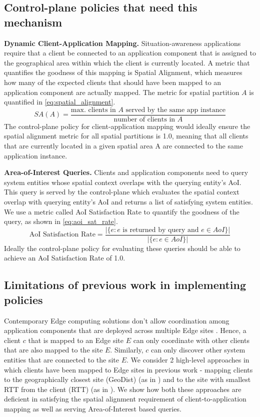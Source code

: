 \subsection{Control-plane policies that need this mechanism}
\par \textbf{Dynamic Client-Application Mapping. } Situation-awareness applications require that a client be connected to an application component that is assigned to the geographical area within which the client is currently located. A metric that quantifies the goodness of this mapping is Spatial Alignment, which measures how many of the expected clients that should have been mapped to an application component are actually mapped. The metric for spatial partition $A$ is quantified in \cref{eq:spatial_alignment}.
\begin{equation}
SA \left( A \right) = \dfrac{\text{max. clients in }A\text{ served by the same app instance}}{\text{number of clients in }A}
\label{eq:spatial_alignment}
\end{equation}
The control-plane policy for client-application mapping would ideally ensure the spatial alignment metric for all spatial partitions is 1.0, meaning that all clients that are currently located in a given spatial area A are connected to the same application instance.

\par \textbf{Area-of-Interest Queries. } Clients and application components need to query system entities whose spatial context overlaps with the querying entity's AoI. This query is served by the control-plane which evaluates the spatial context overlap with querying entity's AoI and returns a list of satisfying system entities. We use a metric called AoI Satisfaction Rate to quantify the goodness of the query, as shown in \cref{eq:aoi_sat_rate}.
\begin{equation}
\text{AoI Satisfaction Rate} = \dfrac{|\{ e: e \text{ is returned by query  and } e \in AoI \}|}{|\{ e: e \in AoI \}|}
\label{eq:aoi_sat_rate}
\end{equation}
Ideally the control-plane policy for evaluating these queries should be able to achieve an AoI Satisfaction Rate of 1.0.


\subsection{Limitations of previous work in implementing policies}
Contemporary Edge computing solutions don't allow coordination among application components that are deployed across multiple Edge sites \cite{gabriel, azure_iot_edge}. Hence, a client $c$ that is mapped to an Edge site $E$ can only coordinate with other clients that are also mapped to the site $E$. Similarly, $c$ can only discover other system entities that are connected to the site $E$. We consider 2 high-level approaches in which clients have been mapped to Edge sites in previous work - mapping clients to the geographically closest site (GeoDist) (as in \cite{lahderanta2021edge}) and to the site with smallest RTT from the client (RTT) (as in \cite{foglets}). We show how both these approaches are deficient in satisfying the spatial alignment requirement of client-to-application mapping as well as serving Area-of-Interest based queries.

